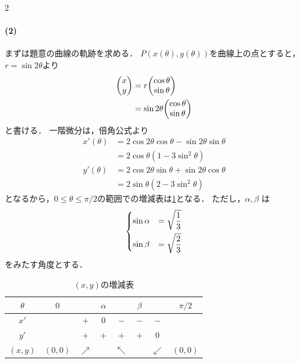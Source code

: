\documentclass[../../main.tex]{subfiles}
\begin{document}
\begin{multicols}{2}
  \paragraph{(2)}
  まずは題意の曲線の軌跡を求める．
  $P(x(\theta),y(\theta))$を曲線上の点とすると，$r=\sin 2\theta$より
  \begin{align}
    \mqty(x                            \\ y)
    & = r \mqty(\cos\theta            \\ \sin\theta) \\
    & = \sin 2\theta \mqty(\cos\theta \\ \sin\theta)
  \end{align}
  と書ける．
  一階微分は，倍角公式より
  \begin{align}
    x'(\theta)
    & = 2\cos 2\theta\cos\theta - \sin 2\theta\sin\theta \\
    & = 2\cos\theta(1-3\sin^2\theta)                    \\
    y'(\theta) & = 2\cos 2\theta\sin\theta + \sin 2\theta\cos\theta \\
    & = 2\sin\theta(2-3\sin^2\theta)
  \end{align}
  となるから，$0 \le \theta \le \pi/2$の範囲での増減表は\cref{1998-6:table:1}となる．
  ただし，$\alpha, \beta$ は
  \begin{align}
    \begin{dcases}
      \sin\alpha & = \sqrt{\dfrac{1}{3}} \\
      \sin\beta  & = \sqrt{\dfrac{2}{3}}
    \end{dcases} \label{eq:1}
  \end{align}
  をみたす角度とする．
  \begin{table}[H]
    \centering
    \caption{$(x,y)$の増減表}
    \label{1998-6:table:1}
    \begin{tabular}{|c||c|c|c|c|c|c|c|}
      \hline
      $\theta$ & $0$     &            & $\alpha$ &            & $\beta$ &            & $\pi/2$ \\
      \hline
      $x'$     &         & $+$        & $0$      & $-$        & $-$     & $-$        &         \\
      \hline
      $y'$     &         & $+$        & $+$      & $+$        & $+$     & $0$        &         \\
      \hline
      $(x,y)$  & $(0,0)$ & $\nearrow$ &          & $\nwarrow$ &         & $\swarrow$ & $(0,0)$ \\
      \hline
    \end{tabular}

\end{table}
\end{multicols}
\end{document}
